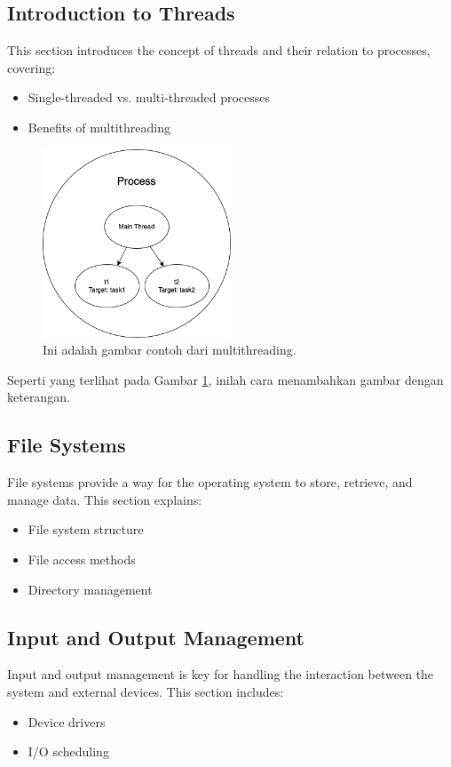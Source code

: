 \documentclass[12pt]{article}
\begin{document}
\subsection{Introduction to Threads}
This section introduces the concept of threads and their relation to processes, covering:
\begin{itemize}
    \item Single-threaded vs. multi-threaded processes
    \item Benefits of multithreading
\end{itemize}

\begin{figure}[h]
    \centering
    \includegraphics[width=0.5\textwidth]{asset/example.png}  %
    \caption{Ini adalah gambar contoh dari multithreading.}
    \label{fig:contoh_gambar}
\end{figure}

Seperti yang terlihat pada Gambar \ref{fig:contoh_gambar}, inilah cara menambahkan gambar dengan keterangan.

\subsection{File Systems}
File systems provide a way for the operating system to store, retrieve, and manage data. This section explains:
\begin{itemize}
    \item File system structure
    \item File access methods
    \item Directory management
\end{itemize}

\subsection{Input and Output Management}
Input and output management is key for handling the interaction between the system and external devices. This section includes:
\begin{itemize}
    \item Device drivers
    \item I/O scheduling
\end{itemize}
\end{document}
